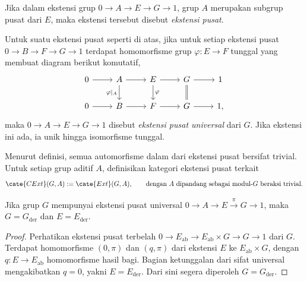 \begin{definition}\label{def:central-ext}
	Jika dalam ekstensi grup $0\to A\to E\to G\to1$, grup $A$ merupakan
	subgrup pusat dari $E$, maka ekstensi tersebut disebut \emph{ekstensi
	pusat}.

	Untuk suatu ekstensi pusat seperti di atas, jika untuk setiap ekstensi pusat
	$0\to B\to F\to G\to1$ terdapat homomorfisme grup $\varphi:E\to F$ tunggal
	yang membuat diagram berikut komutatif,
	\[\begin{tikzcd}
		0 \arrow[r] & A \arrow[r] \arrow[d,"{\varphi|_A}"'] &
		E \arrow[d,"\varphi"] \arrow[r] & G \arrow[equal,d] \arrow[r] & 1 \\
		0 \arrow[r] & B \arrow[r] & F \arrow[r] & G \arrow[r] & 1,
	\end{tikzcd}\]
	maka $0\to A\to E\to G\to1$ disebut \emph{ekstensi pusat universal} dari
	$G$. Jika ekstensi ini ada, ia unik hingga isomorfisme tunggal.
\end{definition}

Menurut definisi, semua automorfisme dalam dari ekstensi pusat bersifat
trivial. Untuk setiap grup aditif $A$, definisikan kategori ekstensi pusat
terkait
\[ \cate{CExt}(G,A):=\cate{Ext}(G,A),\qquad
	\text{dengan $A$ dipandang sebagai modul-$G$ beraksi trivial}. \]

\begin{lemma}\label{prop:univ-central-ext-prep}
	Jika grup $G$ mempunyai ekstensi pusat universal
	$0\to A\to E\xrightarrow{\pi}G\to1$, maka
	$G=G_{\mathrm{der}}$ dan $E=E_{\mathrm{der}}$.
\end{lemma}
\begin{proof}
	Perhatikan ekstensi pusat terbelah
	$0\to E_{\mathrm{ab}}\to E_{\mathrm{ab}}\times G\to G\to1$ dari $G$.
	Terdapat homomorfisme $(0,\pi)$ dan $(q,\pi)$ dari ekstensi $E$ ke
	$E_{\mathrm{ab}}\times G$, dengan $q:E\to E_{\mathrm{ab}}$ homomorfisme
	hasil bagi. Bagian ketunggalan dari sifat universal mengakibatkan $q=0$,
	yakni $E=E_{\mathrm{der}}$. Dari sini segera diperoleh
	$G=G_{\mathrm{der}}$.
\end{proof}

